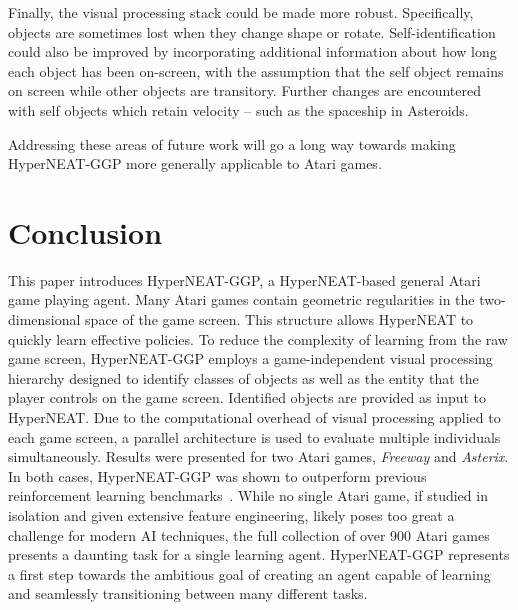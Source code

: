 \documentclass{acm_proc_article-sp}
\begin{document}

Finally, the visual processing stack could be made more robust. Specifically, objects are sometimes lost when they change shape or rotate. Self-identification could also be improved by incorporating additional information about how long each object has been on-screen, with the assumption that the self object remains on screen while other objects are transitory. Further changes are encountered with self objects which retain velocity -- such as the spaceship in Asteroids. 

Addressing these areas of future work will go a long way towards making HyperNEAT-GGP more generally applicable to Atari games.

\section{Conclusion}
\label{sec:conclusion}
This paper introduces HyperNEAT-GGP, a HyperNEAT-based general Atari game playing agent. Many Atari games contain geometric regularities in the two-dimensional space of the game screen. This structure allows HyperNEAT to quickly learn effective policies. To reduce the complexity of learning from the raw game screen, HyperNEAT-GGP employs a game-independent visual processing hierarchy designed to identify classes of objects as well as the entity that the player controls on the game screen. Identified objects are provided as input to HyperNEAT. Due to the computational overhead of visual processing applied to each game screen, a parallel architecture is used to evaluate multiple individuals simultaneously. Results were presented for two Atari games, \textit{Freeway} and \textit{Asterix}. In both cases, HyperNEAT-GGP was shown to outperform previous reinforcement learning benchmarks~\cite{naddaf10}. While no single Atari game, if studied in isolation and given extensive feature engineering, likely poses too great a challenge for modern AI techniques, the full collection of over 900 Atari games presents a daunting task for a single learning agent. HyperNEAT-GGP represents a first step towards the ambitious goal of creating an agent capable of learning and seamlessly transitioning between many different tasks.
\end{document}
